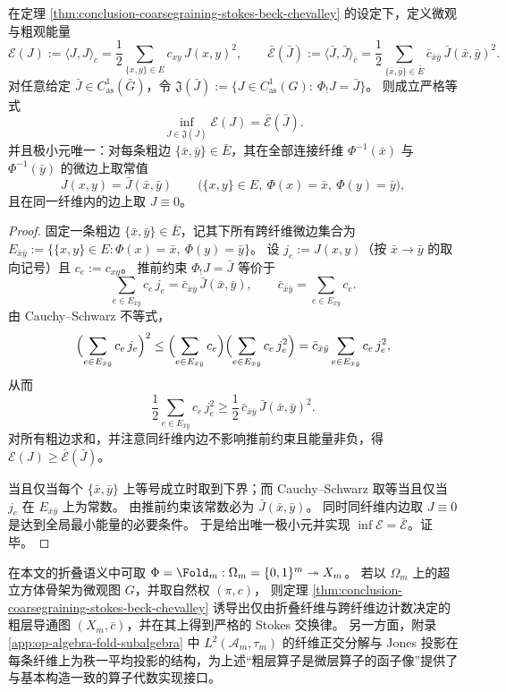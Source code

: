 \begin{proposition}\label{prop:conclusion-coarsegraining-energy-infimum}
在定理 \ref{thm:conclusion-coarsegraining-stokes-beck-chevalley} 的设定下，定义微观与粗观能量
\[
\mathcal E(J):=\langle J,J\rangle_c=\frac12\sum_{\{x,y\}\in E}c_{xy}\,J(x,y)^2,
\qquad
\bar{\mathcal E}(\bar J):=\langle \bar J,\bar J\rangle_{\bar c}
=\frac12\sum_{\{\bar x,\bar y\}\in\bar E}\bar c_{\bar x\bar y}\,\bar J(\bar x,\bar y)^2.
\]
对任意给定 \(\bar J\in C^1_{\mathrm{as}}(\bar G)\)，令
\(
\mathfrak J(\bar J):=\{J\in C^1_{\mathrm{as}}(G):\ \Phi_!J=\bar J\}
\)。
则成立严格等式
\[
\inf_{J\in\mathfrak J(\bar J)}\mathcal E(J)=\bar{\mathcal E}(\bar J).
\]
并且极小元唯一：对每条粗边 \(\{\bar x,\bar y\}\in\bar E\)，其在全部连接纤维 \(\Phi^{-1}(\bar x)\) 与 \(\Phi^{-1}(\bar y)\) 的微边上取常值
\[
J(x,y)=\bar J(\bar x,\bar y)\qquad
\bigl(\{x,y\}\in E,\ \Phi(x)=\bar x,\ \Phi(y)=\bar y\bigr),
\]
且在同一纤维内的边上取 \(J\equiv 0\)。
\end{proposition}
\begin{proof}
固定一条粗边 \(\{\bar x,\bar y\}\in\bar E\)，记其下所有跨纤维微边集合为
\(
E_{\bar x\bar y}:=\{\{x,y\}\in E:\Phi(x)=\bar x,\ \Phi(y)=\bar y\}
\)。
设 \(j_e:=J(x,y)\)（按 \(\bar x\to\bar y\) 的取向记号）且 \(c_e:=c_{xy}\)。
推前约束 \(\Phi_!J=\bar J\) 等价于
\[
\sum_{e\in E_{\bar x\bar y}}c_e\,j_e=\bar c_{\bar x\bar y}\,\bar J(\bar x,\bar y),
\qquad
\bar c_{\bar x\bar y}=\sum_{e\in E_{\bar x\bar y}}c_e.
\]
由 Cauchy--Schwarz 不等式，
\[
\Bigl(\sum_{e\in E_{\bar x\bar y}}c_e\,j_e\Bigr)^2
\le
\Bigl(\sum_{e\in E_{\bar x\bar y}}c_e\Bigr)\Bigl(\sum_{e\in E_{\bar x\bar y}}c_e\,j_e^2\Bigr)
=\bar c_{\bar x\bar y}\sum_{e\in E_{\bar x\bar y}}c_e\,j_e^2,
\]
从而
\[
\frac12\sum_{e\in E_{\bar x\bar y}}c_e\,j_e^2
\ge
\frac12\,\bar c_{\bar x\bar y}\,\bar J(\bar x,\bar y)^2.
\]
对所有粗边求和，并注意同纤维内边不影响推前约束且能量非负，得
\(
\mathcal E(J)\ge \bar{\mathcal E}(\bar J)
\)。
\par
当且仅当每个 \(\{\bar x,\bar y\}\) 上等号成立时取到下界；而 Cauchy--Schwarz 取等当且仅当
\(
j_e
\)
在 \(E_{\bar x\bar y}\) 上为常数。
由推前约束该常数必为 \(\bar J(\bar x,\bar y)\)。
同时同纤维内边取 \(J\equiv 0\) 是达到全局最小能量的必要条件。
于是给出唯一极小元并实现 \(\inf\mathcal E=\bar{\mathcal E}\)。证毕。
\end{proof}

\begin{remark}[折叠的具体化与粗层导通图]\label{rem:conclusion-fold-stokes-coarsegraining}
在本文的折叠语义中可取 \(\Phi=\Fold_m:\Omega_m=\{0,1\}^m\twoheadrightarrow X_m\)。
若以 \(\Omega_m\) 上的超立方体骨架为微观图 \(G\)，并取自然权 \((\pi,c)\)，
则定理 \ref{thm:conclusion-coarsegraining-stokes-beck-chevalley} 诱导出仅由折叠纤维与跨纤维边计数决定的粗层导通图 \((X_m,\bar c)\)，并在其上得到严格的 Stokes 交换律。
另一方面，附录 \ref{app:op-algebra-fold-subalgebra} 中 \(L^2(\mathcal A_m,\tau_m)\) 的纤维正交分解与 Jones 投影在每条纤维上为秩一平均投影的结构，为上述“粗层算子是微层算子的函子像”提供了与基本构造一致的算子代数实现接口。
\end{remark}

